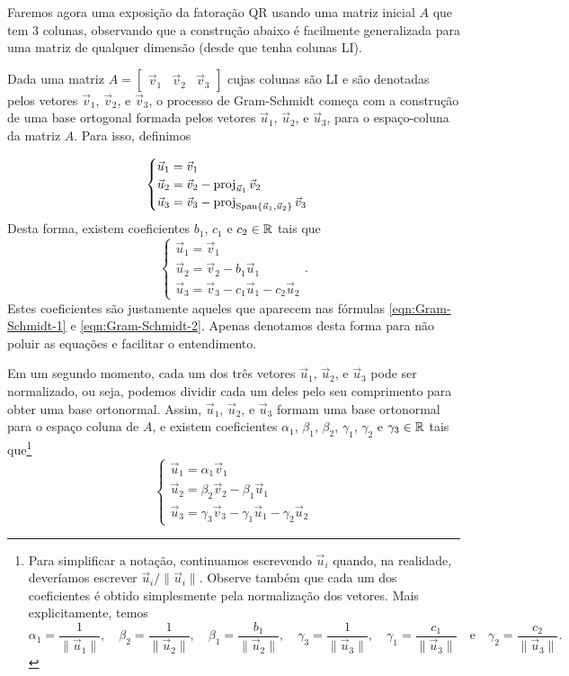 \documentclass[../livro.tex]{subfiles}  %
\begin{document}
\medskip

Faremos agora uma exposição da fatoração QR usando uma matriz inicial $A$ que tem 3 colunas, observando que a construção abaixo é facilmente generalizada para uma matriz de qualquer dimensão (desde que tenha colunas LI).

Dada uma matriz $A=\begin{bmatrix}
\vec{v}_1 & \vec{v}_2 & \vec{v}_3
\end{bmatrix}$ cujas colunas são LI e são denotadas pelos vetores $\vec{v}_1$, $\vec{v}_2$, e $\vec{v}_3$, 
o processo de Gram-Schmidt começa com a construção de uma base ortogonal formada pelos vetores
$\vec{u}_1$, $\vec{u}_2$, e $\vec{u}_3$,
para o espaço-coluna da matriz $A$. Para isso, definimos

\[
\begin{cases}
\vec{u}_1 = \vec{v}_1 \\ 
\vec{u}_2 = \vec{v}_2 - \operatorname{proj}_{\vec{u}_1} \vec{v}_2 \\
\vec{u}_3 = \vec{v}_3 - \operatorname{proj}_{\operatorname{Span}\{\vec{u}_1,\vec{u}_2\}} \vec{v}_3
\end{cases}
\]
Desta forma, existem coeficientes $b_1$, $c_1$ e $c_2 \in \mathbb{R}$ tais que
\[
\begin{cases}
\vec{u}_1 = \vec{v}_1 \\ 
\vec{u}_2 = \vec{v}_2 - b_1 \vec{u}_1 \\
\vec{u}_3 = \vec{v}_3 - c_1 \vec{u}_1 - c_2 \vec{u}_2
\end{cases}.
\] Estes coeficientes são justamente aqueles que aparecem nas fórmulas \eqref{eqn:Gram-Schmidt-1} e \eqref{eqn:Gram-Schmidt-2}. Apenas denotamos desta forma para não poluir as equações e facilitar o entendimento.

Em um segundo momento, cada um dos três vetores $\vec{u}_1$, $\vec{u}_2$, e $\vec{u}_3$ pode ser normalizado, ou seja, podemos dividir cada um deles pelo seu comprimento para obter uma base ortonormal. Assim, $\vec{u}_1$, $\vec{u}_2$, e $\vec{u}_3$ formam uma base ortonormal para o espaço coluna de $A$, e existem coeficientes $\alpha_1$, $\beta_1$, $\beta_2$, $\gamma_1$, $\gamma_2$ e $\gamma_3 \in \mathbb{R}$ tais que\footnote{Para simplificar a notação, continuamos escrevendo $\vec{u}_i$ quando, na realidade, deveríamos escrever $\vec{u}_i/\|\vec{u}_i\|$. Observe também que cada um dos coeficientes é obtido simplesmente pela normalização dos vetores. Mais explicitamente, temos
\[
\alpha_1 = \frac{1}{\|\vec{u}_1\|}, \quad \beta_2 = \frac{1}{\|\vec{u}_2\|}, \quad \beta_1 = \frac{b_1}{\|\vec{u}_2\|}, \quad \gamma_3 = \frac{1}{\|\vec{u}_3\|}, \quad \gamma_1 = \frac{c_1}{\|\vec{u}_3\|} \quad \text{e} \quad \gamma_2 = \frac{c_2}{\|\vec{u}_3\|}.
\]}
\[
\begin{cases}
\vec{u}_1 = \alpha_1\vec{v}_1 \\ 
\vec{u}_2 = \beta_2 \vec{v}_2 - \beta_1 \vec{u}_1 \\
\vec{u}_3 = \gamma_3 \vec{v}_3 - \gamma_1 \vec{u}_1 - \gamma_2 \vec{u}_2
\end{cases}
\]
\end{document}
